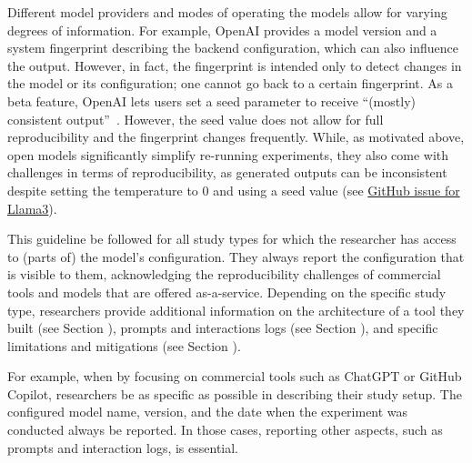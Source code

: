 
Different model providers and modes of operating the models allow for varying degrees of information.
For example, OpenAI provides a model version and a system fingerprint describing the backend configuration, which can also influence the output.
However, in fact, the fingerprint is intended only to detect changes in the model or its configuration; one cannot go back to a certain fingerprint.
As a beta feature, OpenAI lets users set a seed parameter to receive ``(mostly) consistent output''~\cite{OpenAI23}.
However, the seed value does not allow for full reproducibility and the fingerprint changes frequently. 
While, as motivated above, open models significantly simplify re-running experiments, they also come with challenges in terms of reproducibility, as generated outputs can be inconsistent despite setting the temperature to 0 and using a seed value (see \href{https://github.com/ollama/ollama/issues/5321}{GitHub issue for Llama3}).


This guideline \must be followed for all study types for which the researcher has access to (parts of) the model's configuration.
They \must always report the configuration that is visible to them, acknowledging the reproducibility challenges of commercial tools and models that are offered as-a-service. 
Depending on the specific study type, researchers \should provide additional information on the architecture of a tool they built (see Section \toolarchitecture), prompts and interactions logs (see Section \prompts), and specific limitations and mitigations (see Section \limitationsmitigations).

For example, when \llmusage by focusing on commercial tools such as ChatGPT or GitHub Copilot, researchers \must be as specific as possible in describing their study setup.
The configured model name, version, and the date when the experiment was conducted \must always be reported.
In those cases, reporting other aspects, such as prompts and interaction logs, is essential.
